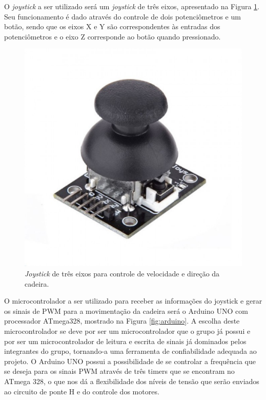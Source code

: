 O \textit{joystick} a ser utilizado será um \textit{joystick} 
de três eixos, apresentado na Figura \ref{fig:joystick}. Seu funcionamento é dado através do controle de 
dois potenciômetros e um botão, sendo que os eixos X e Y são 
correspondentes às entradas dos potenciômetros e o eixo Z corresponde ao botão quando pressionado.

\begin{figure}[H]
  \centering
    \includegraphics[scale=0.4]{figuras/joystick.eps}
  \caption{\textit{Joystick} de três eixos para controle de velocidade e direção da cadeira.}
  \label{fig:joystick}
\end{figure}

O microcontrolador a ser utilizado para receber as informações 
do joystick e gerar os sinais de PWM para a movimentação 
da cadeira será o Arduino UNO com processador ATmega328, mostrado na Figura \ref{fig:arduino}. A escolha deste 
microcontrolador se deve por ser um microcontrolador que o grupo 
já possui e por ser um microcontrolador de leitura e escrita de 
sinais já dominados pelos integrantes do grupo, tornando-a 
uma ferramenta de confiabilidade adequada ao projeto. O Arduino UNO
possui a possibilidade de se controlar a frequência que se deseja 
para os sinais 
PWM através de três timers que se encontram no ATmega 328, o que nos 
dá a flexibilidade dos níveis de tensão que serão enviados ao 
circuito de ponte H e do controle dos motores.

